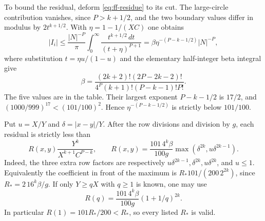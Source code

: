 \documentclass[12pt]{article}
\numberwithin{equation}{section}
\begin{document}
To bound the residual, deform \eqref{eq:ff-residue} to its cut.
The large-circle contribution vanishes, since $P>k+1/2$, and the
two boundary values differ in modulus by $2t^{k+1/2}$.
With $\eta=1-1/(XC)$ one obtains
\[
 |I_i|\le \frac{|N|^{-P}}\pi
       \int_0^\infty\frac{t^{k+1/2}\,dt}{(t+\eta)^{P+1}}
 =\beta\eta^{-(P-k-1/2)}|N|^{-P},
\]
where substitution $t=\eta u/(1-u)$ and the elementary half-integer
beta integral give
\begin{equation}\label{eq:ff-beta}
 \beta=\frac{(2k+2)!(2P-2k-2)!}
 {4^P(k+1)!(P-k-1)!P!}.
\end{equation}
The five values are in the table. Their largest exponent
$P-k-1/2$ is $17/2$, and
$(1000/999)^{17}<(101/100)^2$. Hence $\eta^{-(P-k-1/2)}$ is
strictly below $101/100$.

Put $u=X/Y$ and $\delta=|x-y|/Y$. After the row divisions and division
by $g$, each residual is strictly less than
\begin{equation}\label{eq:ff-point-residual}
 R(x,y)\frac{Y^k}{X^{k+1}C^{P-k}},\qquad
 R(x,y)=\frac{101\,4^k\beta}{100g}
             \max(\delta^{2k},u\delta^{2k-1}).
\end{equation}
Indeed, the three extra row factors are respectively
$u\delta^{2k-1},\delta^{2k},u\delta^{2k}$, and $u\le1$.
Equivalently the coefficient in front of the maximum is
$R_*101/(200\,2^{2k})$, since $R_*=2\,16^k\beta/g$.
If only $Y\ge qX$ with $q\ge1$ is known, one may use
\begin{equation}\label{eq:ff-ratio-residual}
 R(q)=\frac{101\,4^k\beta}{100g}(1+1/q)^{2k}.
\end{equation}
In particular $R(1)=101R_*/200<R_*$, so every listed $R_*$ is valid.
\end{document}
